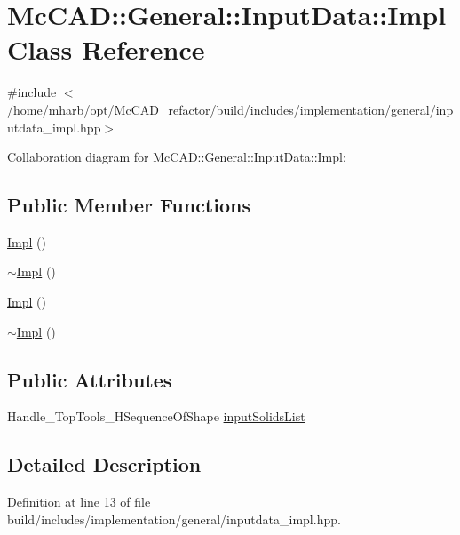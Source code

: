 \hypertarget{classMcCAD_1_1General_1_1InputData_1_1Impl}{}\section{Mc\+C\+AD\+:\+:General\+:\+:Input\+Data\+:\+:Impl Class Reference}
\label{classMcCAD_1_1General_1_1InputData_1_1Impl}


{\ttfamily \#include $<$/home/mharb/opt/\+Mc\+C\+A\+D\+\_\+refactor/build/includes/implementation/general/inputdata\+\_\+impl.\+hpp$>$}



Collaboration diagram for Mc\+C\+AD\+:\+:General\+:\+:Input\+Data\+:\+:Impl\+:
\subsection*{Public Member Functions}
\begin{DoxyCompactItemize}
\item 
\hyperlink{classMcCAD_1_1General_1_1InputData_1_1Impl_a58d0d5280635227702d6e0337838462d}{Impl} ()
\item 
\hyperlink{classMcCAD_1_1General_1_1InputData_1_1Impl_afbba4c1853dc427b7a41dcf312a0f6b4}{$\sim$\+Impl} ()
\item 
\hyperlink{classMcCAD_1_1General_1_1InputData_1_1Impl_a58d0d5280635227702d6e0337838462d}{Impl} ()
\item 
\hyperlink{classMcCAD_1_1General_1_1InputData_1_1Impl_afbba4c1853dc427b7a41dcf312a0f6b4}{$\sim$\+Impl} ()
\end{DoxyCompactItemize}
\subsection*{Public Attributes}
\begin{DoxyCompactItemize}
\item 
Handle\+\_\+\+Top\+Tools\+\_\+\+H\+Sequence\+Of\+Shape \hyperlink{classMcCAD_1_1General_1_1InputData_1_1Impl_ad33f29cde304019a7b7ac34b9485086f}{input\+Solids\+List}
\end{DoxyCompactItemize}


\subsection{Detailed Description}


Definition at line 13 of file build/includes/implementation/general/inputdata\+\_\+impl.\+hpp.



